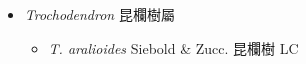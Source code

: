 
  \begin{itemize}
 \item[] \textit{Trochodendron} 昆欄樹屬
                                
  \begin{itemize}
        \item[] \textit{T. aralioides} Siebold \& Zucc.  昆欄樹   LC
  \end{itemize}
  \end{itemize}
